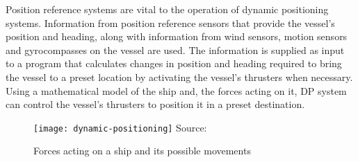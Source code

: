 

Position reference systems are vital to the operation of dynamic positioning systems. Information from position reference sensors that provide the vessel’s position and heading, along with information from wind sensors, motion sensors and gyrocompasses on the vessel are used. The information is supplied as input to a program that calculates changes in position and heading required to bring the vessel to a preset location by activating the vessel’s thrusters when necessary. Using a mathematical model of the ship and, the forces acting on it, DP system can control the vessel's thrusters to position it in a preset destination.

%
%

\begin{figure}
	\centering
	\caption{Forces acting on a ship and its possible movements}
	\texttt{[image: dynamic-positioning]}
	\hbox{\small Source: }
	\label{fig:shipforces}
\end{figure}

